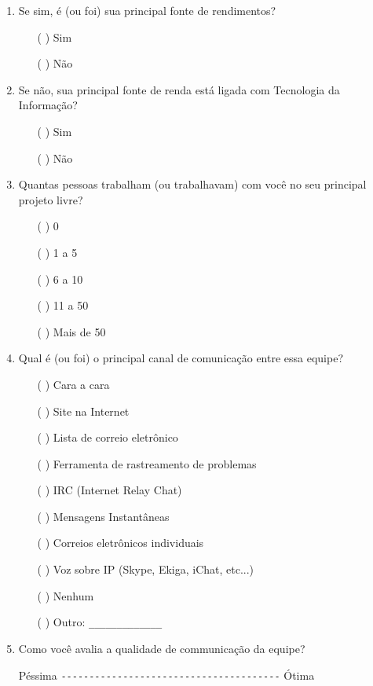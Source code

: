 \begin{enumerate}
\item Se sim, é (ou foi) sua principal fonte de rendimentos?
  \begin{itemize}
  \item[( )] Sim
  \item[( )] Não
  \end{itemize}

\item Se não, sua principal fonte de renda está ligada com Tecnologia
  da Informação?
  \begin{itemize}
  \item[( )] Sim
  \item[( )] Não
  \end{itemize}

\item Quantas pessoas trabalham (ou trabalhavam) com você no seu
  principal projeto livre?
  \begin{itemize}
  \item[( )] 0
  \item[( )] 1 a 5
  \item[( )] 6 a 10
  \item[( )] 11 a 50
  \item[( )] Mais de 50
  \end{itemize}

\item Qual é (ou foi) o principal canal de comunicação entre essa equipe?
  \begin{itemize}
  \item[( )] Cara a cara
  \item[( )] Site na Internet
  \item[( )] Lista de correio eletrônico
  \item[( )] Ferramenta de rastreamento de problemas
  \item[( )] IRC (Internet Relay Chat)
  \item[( )] Mensagens Instantâneas
  \item[( )] Correios eletrônicos individuais
  \item[( )] Voz sobre IP (Skype, Ekiga, iChat, etc...)
  \item[( )] Nenhum
  \item[( )] Outro: \verb=_____________=
  \end{itemize}

\item Como você avalia a qualidade de communicação da equipe?

  Péssima \verb=---------------------------------------= Ótima


\end{enumerate}

